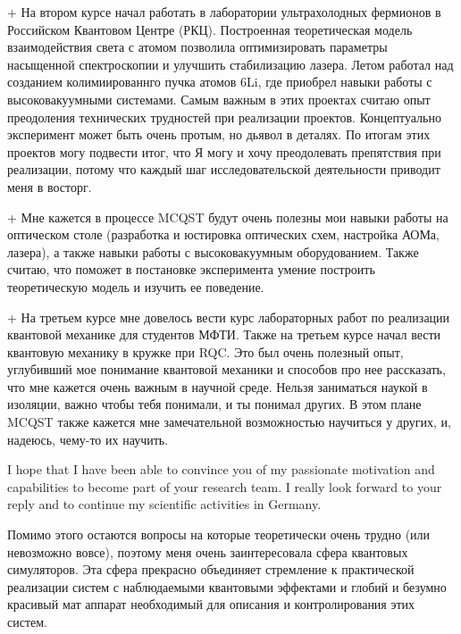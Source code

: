 +
На втором курсе начал работать в лаборатории ультрахолодных фермионов в Российском Квантовом Центре (РКЦ). Построенная теоретическая модель взаимодействия света с атомом позволила оптимизировать параметры насыщенной спектроскопии и улучшить стабилизацию лазера. Летом работал над созданием колимиированнго пучка атомов 6Li, где приобрел навыки работы с высоковакуумными системами. Самым важным в этих проектах считаю опыт преодоления технических трудностей при реализации проектов. Концептуально эксперимент может быть очень протым, но дьявол в деталях. По итогам этих проектов могу подвести итог, что Я могу и хочу преодолевать препятствия при реализации, потому что каждый шаг исследовательской деятельности приводит меня в восторг.

+
Мне кажется в процессе MCQST будут очень полезны мои навыки работы на оптическом столе (разработка и юстировка оптических схем, настройка АОМа, лазера), а также навыки работы с высоковакуумным оборудованием. Также считаю, что поможет в постановке эксперимента умение построить теоретическую модель и изучить ее поведение. 

+
На третьем курсе мне довелось вести курс лабораторных работ по реализации квантовой механике для студентов МФТИ. Также на третьем курсе начал вести квантовую механику в кружке при RQC. Это был очень полезный опыт, углубивший мое понимание квантовой механики и способов про нее рассказать, что мне кажется очень важным в научной среде. Нельзя заниматься наукой в изоляции, важно чтобы тебя понимали, и ты понимал других. В этом плане MCQST  также кажется мне замечательной возможностью научиться у других, и, надеюсь, чему-то их научить.



I hope that I have been able to convince you of my passionate motivation and  capabilities to become part of your research team. I really look forward to your reply and to continue my scientific activities in Germany.







Помимо этого остаются вопросы на которые теоретически очень трудно (или невозможно вовсе), поэтому меня очень заинтересовала сфера квантовых симуляторов. Эта сфера прекрасно объединяет стремление к практической реализации систем с наблюдаемыми квантовыми эффектами и глобий и безумно красивый мат аппарат необходимый для описания и контролирования этих систем. 




